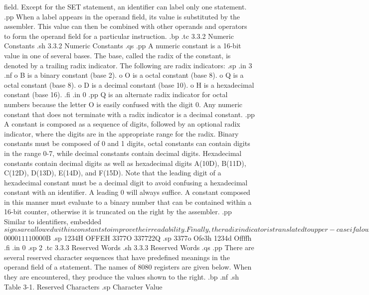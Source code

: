 field.  Except for the SET statement, an identifier can label 
only one statement.
.pp
When a label appears in the operand field, its value is 
substituted by the assembler.  This value can then be combined 
with other operands and operators to form the operand field for a 
particular instruction.
.bp
.tc         3.3.2  Numeric Constants
.sh
3.3.2  Numeric Constants
.qs
.pp
A numeric constant is a 16-bit value in one of several bases.  
The base, called the radix of the constant, is denoted by a 
trailing radix indicator.  The following are radix indicators:
.sp
.in 3
.nf
o B is a binary constant (base 2).
o O is a octal constant (base 8).
o Q is a octal constant (base 8).
o D is a decimal constant (base 10).
o H is a hexadecimal constant (base 16).
.fi
.in 0
.pp
Q is an alternate radix indicator for octal numbers because the 
letter O is easily confused with the digit 0.  Any numeric 
constant that does not terminate with a radix indicator is 
a decimal constant.
.pp
A constant is composed as a sequence of digits, followed by 
an optional radix indicator, where the digits are in the 
appropriate range for the radix.  Binary constants must 
be composed of 0 and 1 digits, octal constants can contain digits 
in the range 0-7, while decimal constants contain decimal digits.  
Hexadecimal constants contain decimal digits as well as 
hexadecimal digits A(10D), B(11D), C(12D), D(13D), E(14D), and 
F(15D).  Note that the leading digit of a 
hexadecimal constant must be a decimal digit to avoid confusing a 
hexadecimal constant with an identifier.  A leading 0 will always 
suffice.  A constant composed in this manner must evaluate to a 
binary number that can be contained within a 16-bit counter, 
otherwise it is truncated on the right by the assembler.
.pp
Similar 
to identifiers, embedded $ signs are allowed within constants to 
improve their readability.  Finally, the radix indicator is 
translated to upper-case if a lower-case letter is encountered.  
The following are all valid instances of numeric constants:
.sp 2
.nf
.in 8
1234      1234D     1100B     1111$0000$1111$0000B
.sp
1234H     OFFEH     3377O     33$77$22Q
.sp
3377o     Ofe3h     1234d     Offffh
.fi
.in 0
.sp 2
.tc         3.3.3  Reserved Words
.sh
3.3.3  Reserved Words
.qs
.pp
There are several reserved character sequences that have 
predefined meanings in the operand field of a statement.  The 
names of 8080 registers are given below.  When they are 
encountered, they produce the values shown to the right.
.bp
.nf
.sh
                 Table 3-1.  Reserved Characters
.sp
                       Character     Value


